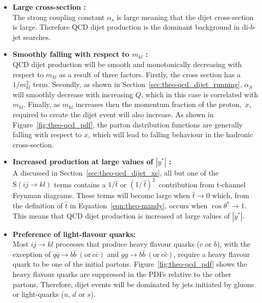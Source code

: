 \begin{itemize}[leftmargin=*]
\item\textbf{Large cross-section :}\\
  The strong coupling constant $\alpha_s$ is large meaning that the dijet cross-section is large.
  Therefore QCD dijet production is the dominant background in di-$b$-jet searches.\vspace{0.5em}
  
\item\textbf{Smoothly falling with respect to $m_{kl}$ :}\\
  QCD dijet production will be smooth and monotonically decreasing
  with respect to $m_{kl}$ as a result of three factors.
  Firstly, the cross section has a $1/m_{kl}^{2}$ term.
  Secondly, as shown in Section~\ref{sec:theo-qcd_dijet_running},
  $\alpha_S$ will smoothly decrease with increasing $Q$, which in this case is correlated with $m_{kl}$.
  Finally, as $m_{kl}$ increases then the momentum fraction of the \mbox{proton, $x$,} required to create
  the dijet event will also increase.
  As shown in Figure~\ref{fig:theo-qcd_pdf}, the parton distribution functions are generally falling 
  with respect to $x$, which will lead to falling behaviour in the hadronic cross-section.
  \vspace{0.5em}
  
\item\textbf{Increased production at large values of $|y^*|$ :}\\
  A discussed in Section~\ref{sec:theo-qcd_dijet_xs}, all but one of the $\text{S}(ij \to kl)$ terms
  contains a $1/\hat{t}$ or $(1/\,\hat{t})^2\,$ contribution from t-channel Feynman diagrams.
  These terms will become large when $\hat{t} \to 0$ which, from the definition of $\hat{t}$ in Equation~\ref{eqn:theo-mandy},
  occurs when $\cos{\theta^*} \to 1$.
  This means that QCD dijet production is increased at large values of $|y^*|$.
  \vspace{0.5em}
  
\item\textbf{Preference of light-flavour quarks:}\\
  Most $ij \to kl$ processes that produce heavy flavour quarks ($c$ or $b$),
  with the exception of $q \bar{q} \to b\bar{b} \ (\text{or}\ c\bar{c})$ and $g g \to b\bar{b} \ (\text{or}\ c\bar{c})$,
  require a heavy flavour quark to be one of the initial partons.
  Figure~\ref{fig:theo-qcd_pdf} shows the heavy flavour quarks are suppressed in the PDFs relative to the other partons.
  Therefore, dijet events will be dominated by jets initiated by gluons or light-quarks ($u$, $d$ or $s$).
 
\end{itemize}

